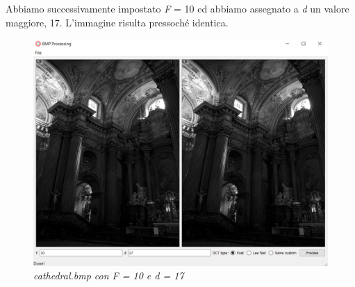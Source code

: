 \documentclass[a4paper,12pt]{report}
\begin{document}
Abbiamo successivamente impostato \textit{F} = 10 ed abbiamo assegnato a \textit{d} un valore maggiore, 17. L'immagine risulta pressoché identica.

\begin{figure}[H]
\centering
\includegraphics[width=0.6\linewidth]{../img/cathedral_10_17.png}
\caption{\textit{cathedral.bmp con F = 10 e d = 17}}
\end{figure}

\printbibliography
\end{document}

